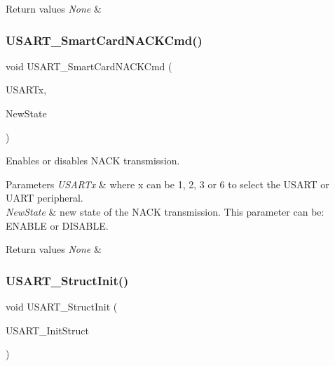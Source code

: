 \begin{DoxyRetVals}{Return values}
{\em None} & \\
\hline
\end{DoxyRetVals}
\mbox{\label{group___u_s_a_r_t_ga62e22f47e38aa53f2edce8771f7a5dfa}} 
\subsubsection{\texorpdfstring{U\+S\+A\+R\+T\+\_\+\+Smart\+Card\+N\+A\+C\+K\+Cmd()}{USART\_SmartCardNACKCmd()}}
{\footnotesize\ttfamily void U\+S\+A\+R\+T\+\_\+\+Smart\+Card\+N\+A\+C\+K\+Cmd (\begin{DoxyParamCaption}\item[{U\+S\+A\+R\+T\+\_\+\+Type\+Def $\ast$}]{U\+S\+A\+R\+Tx,  }\item[{Functional\+State}]{New\+State }\end{DoxyParamCaption})}



Enables or disables N\+A\+CK transmission. 


\begin{DoxyParams}{Parameters}
{\em U\+S\+A\+R\+Tx} & where x can be 1, 2, 3 or 6 to select the U\+S\+A\+RT or U\+A\+RT peripheral. \\
\hline
{\em New\+State} & new state of the N\+A\+CK transmission. This parameter can be\+: E\+N\+A\+B\+LE or D\+I\+S\+A\+B\+LE. ~\newline
\\
\hline
\end{DoxyParams}

\begin{DoxyRetVals}{Return values}
{\em None} & \\
\hline
\end{DoxyRetVals}
\mbox{\label{group___u_s_a_r_t_ga34e1faa2f312496c16cfd05155f4c8b1}} 
\subsubsection{\texorpdfstring{U\+S\+A\+R\+T\+\_\+\+Struct\+Init()}{USART\_StructInit()}}
{\footnotesize\ttfamily void U\+S\+A\+R\+T\+\_\+\+Struct\+Init (\begin{DoxyParamCaption}\item[{\mbox{\hyperlink{struct_u_s_a_r_t___init_type_def}{U\+S\+A\+R\+T\+\_\+\+Init\+Type\+Def}} $\ast$}]{U\+S\+A\+R\+T\+\_\+\+Init\+Struct }\end{DoxyParamCaption})}



